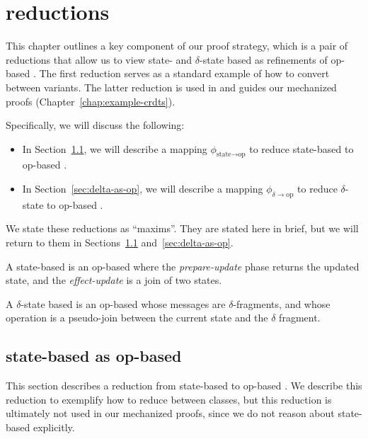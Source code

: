 \chapter{\CRDT reductions}
\label{chap:crdt-reductions}

This chapter outlines a key component of our proof strategy, which is a pair of
reductions that allow us to view state- and $\delta$-state based \CRDTs as
refinements of op-based \CRDTs. The first reduction serves as a standard
example of how to convert between \CRDT variants. The latter reduction is used
in and guides our mechanized proofs (Chapter~\ref{chap:example-crdts}).

Specifically, we will discuss the following:
\begin{itemize}
  \item In Section~\ref{sec:state-as-op}, we will describe a mapping
    $\phi_{\text{state} \to \text{op}}$ to reduce state-based \CRDTs to op-based
    \CRDTs.
  \item In Section~\ref{sec:delta-as-op}, we will describe a mapping
    $\phi_{\delta \to \text{op}}$ to reduce $\delta$-state \CRDTs to op-based
    \CRDTs.
\end{itemize}

We state these reductions as ``maxims''. They are stated here in brief, but we
will return to them in Sections~\ref{sec:state-as-op} and~\ref{sec:delta-as-op}.

\begin{maxim}
  \label{maxim:state-as-op}
  A state-based \CRDT is an op-based \CRDT where the \emph{prepare-update} phase
  returns the updated state, and the \emph{effect-update} is a join of two
  states.
\end{maxim}

\begin{maxim}
  \label{maxim:delta-as-op}
  A $\delta$-state based \CRDT is an op-based \CRDT whose messages are
  $\delta$-fragments, and whose operation is a pseudo-join between the current
  state and the $\delta$ fragment.
\end{maxim}

\section{state-based \CRDTs as op-based}
\label{sec:state-as-op}

This section describes a reduction from state-based \CRDTs to op-based \CRDTs.
We describe this reduction to exemplify how to reduce between \CRDT classes, but
this reduction is ultimately not used in our mechanized proofs, since we do not
reason about state-based \CRDTs explicitly.

